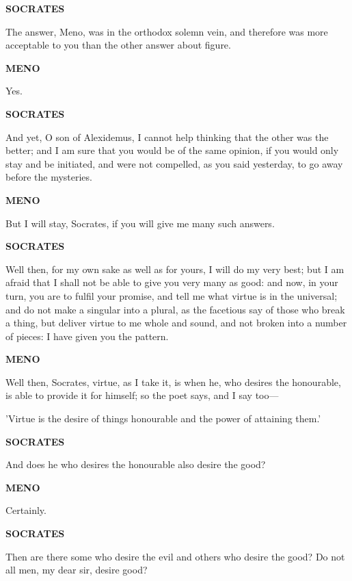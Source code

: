\documentclass[11pt,letter]{article}
\begin{document}
\par \textbf{SOCRATES}
\par   The answer, Meno, was in the orthodox solemn vein, and therefore was more acceptable to you than the other answer about figure.

\par \textbf{MENO}
\par   Yes.

\par \textbf{SOCRATES}
\par   And yet, O son of Alexidemus, I cannot help thinking that the other was the better; and I am sure that you would be of the same opinion, if you would only stay and be initiated, and were not compelled, as you said yesterday, to go away before the mysteries.

\par \textbf{MENO}
\par   But I will stay, Socrates, if you will give me many such answers.

\par \textbf{SOCRATES}
\par   Well then, for my own sake as well as for yours, I will do my very best; but I am afraid that I shall not be able to give you very many as good:  and now, in your turn, you are to fulfil your promise, and tell me what virtue is in the universal; and do not make a singular into a plural, as the facetious say of those who break a thing, but deliver virtue to me whole and sound, and not broken into a number of pieces:  I have given you the pattern.

\par \textbf{MENO}
\par   Well then, Socrates, virtue, as I take it, is when he, who desires the honourable, is able to provide it for himself; so the poet says, and I say too—

\par  'Virtue is the desire of things honourable and the power of attaining them.'

\par \textbf{SOCRATES}
\par   And does he who desires the honourable also desire the good?

\par \textbf{MENO}
\par   Certainly.

\par \textbf{SOCRATES}
\par   Then are there some who desire the evil and others who desire the good? Do not all men, my dear sir, desire good?
\end{document}

